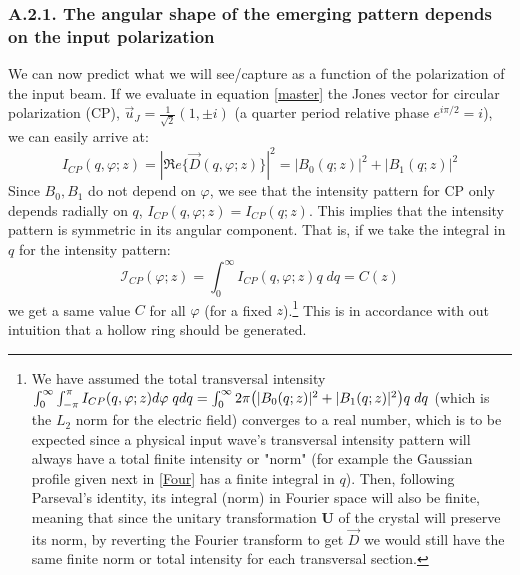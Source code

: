 \documentclass[11pt, a4paper, twoside]{article} %
\begin{document}
\subsubsection*{A.2.1. The angular shape of the emerging pattern depends on the input polarization}

We can now predict what we will see/capture as a function of the polarization of the input beam. If we evaluate in equation \eqref{master} the Jones vector for circular polarization (CP), $\vec{u}_J=\frac{1}{\sqrt{2}}(1,\pm i)$ (a quarter period relative phase $e^{i\pi/2}=i$), we can easily arrive at:
\begin{equation}
I_{CP}(q,\varphi;z)=|\mathfrak{R}e\{\vec{D}(q,\varphi;z)\}|^2=|B_0(q;z)|^2+|B_1(q;z)|^2
\end{equation}
Since $B_0,B_1$ do not depend on $\varphi$, we see that the intensity pattern for CP only depends radially on $q$, $I_{CP}(q,\varphi;z)=I_{CP}(q;z)$. This implies that the intensity pattern is symmetric in its angular component. That is, if we take the integral in $q$ for the intensity pattern:\vspace{-0.1cm}
\begin{equation}\label{yoyo}
\mathcal{I}_{CP}(\varphi;z)=\int_0^\infty I_{CP}(q,\varphi;z)q\;dq=C(z)
\end{equation}
we get a same value $C$ for all $\varphi$ (for a fixed $z$).\footnote{We have assumed the total transversal intensity $\int_0^\infty \int_{-\pi}^{\pi}I_{CP}(q,\varphi;z)d\varphi\;qdq=\int_0^\infty2\pi\qty(|B_0(q;z)|^2+|B_1(q;z)|^2)q\;dq$ (which is the $L_2$ norm for the electric field) converges to a real number, which is to be expected since a physical input wave's transversal intensity pattern will always have a total finite intensity or "norm" (for example the Gaussian profile given next in \eqref{Four} has a finite integral in $q$). Then, following Parseval's identity, its integral (norm) in Fourier space will also be finite, meaning that since the unitary transformation $\pmb{U}$ of the crystal will preserve its norm, by reverting the Fourier transform to get $\vec{D}$ we would still have the same finite norm or total intensity for each transversal section.  } This is in accordance with out intuition that a hollow ring should be generated.\vspace{-0.1cm}
\end{document}
